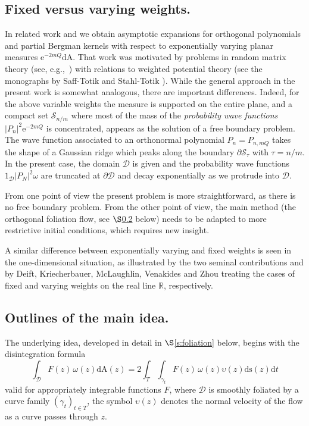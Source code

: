 \documentclass{amsart}
\newcommand{\be}{\begin{equation}}
\newcommand{\ee}{\end{equation}}
\newcommand{\R}{\mathbb{R}}
\newcommand{\calD}{\mathcal{D}}
\newcommand{\calS}{\mathcal{S}}
\newcommand{\diffA}{\mathrm{dA}}
\newcommand{\diffs}{\mathrm{ds}}
\newcommand{\diff}{\mathrm{d}}
\theoremstyle{definition}
\theoremstyle{remark}
\newcommand{\e}{\mathrm{e}}
\numberwithin{equation}{subsection}
\begin{document}
\subsection{Fixed versus varying weights.}
In related work \cite{HW-ONP} and \cite{HW-OFF}
we obtain asymptotic expansions for orthogonal 
polynomials and partial Bergman kernels
with respect to exponentially varying planar 
measures $\e^{-2mQ}\diffA$. That work was motivated by
problems in random matrix theory (see, e.g.,\ 
\cite{WZ, HM, ahm1, ahm2, ahm3}) with relations to weighted
potential theory (see the monographs by Saff-Totik \cite{SaffTotik}
and Stahl-Totik \cite{StahlTotik}). 
While the general approach in the present work is somewhat analogous, 
there are important differences.
Indeed, for the above variable weights the measure is supported
on the entire plane, and a compact set $\calS_{n/m}$
where most of the mass of the 
{\em probability wave functions} $|P_n|^2\e^{-2mQ}$
is concentrated,
appears as the solution of a free boundary problem.
The wave function associated to an 
orthonormal polynomial $P_n=P_{n,mQ}$
takes the shape of a Gaussian ridge which 
peaks along the boundary $\partial\calS_\tau$ with $\tau=n/m$.
In the present case, the domain $\calD$ is given and the 
probability wave 
functions $1_{\calD}|P_N|^2\omega$ are truncated 
at $\partial\calD$ and decay exponentially
as we protrude into $\calD$.

From one point of view the present problem is more straightforward,
as there is no free boundary problem. From the other point of view, 
the main method 
(the orthogonal foliation flow, see $\S$\ref{ss:idea}
below) needs to be adapted to more 
restrictive initial conditions, which
requires new insight.

A similar difference between exponentially varying and fixed
weights is seen in the one-dimensional situation, 
as illustrated by the two seminal contributions \cite{Deift-fixed} and 
\cite{Deift-varying} by Deift, Kriecherbauer, McLaughlin, 
Venakides and Zhou treating the cases of fixed and
varying weights on the real line $\R$, respectively.

\subsection{Outlines of the main idea.}
\label{ss:idea}
The underlying idea, developed in 
detail in $\S$\ref{s:foliation} below,
begins with the disintegration formula
\be\label{eq:disint}
\int_{\calD}F(z)\,\omega(z)\diffA(z)=
2\int_{T}\int_{\gamma_{t}}F(z)\,\omega(z)\upsilon(z)\diffs(z)\diff t
\ee
valid for appropriately integrable functions $F$,
where $\calD$ is smoothly foliated 
by a curve family $(\gamma_t)_{t\in T}$, 
the symbol $\upsilon(z)$ denotes the normal 
velocity of the flow as a curve passes through $z$. 
\end{document}
